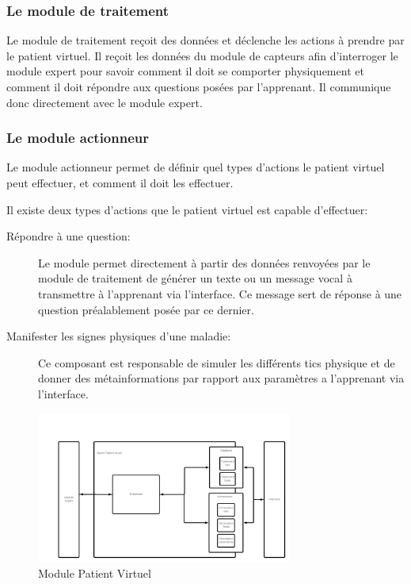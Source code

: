     \subsubsection{Le module de traitement}
    Le module de traitement reçoit des données et déclenche les actions à prendre par le patient virtuel. Il reçoit les données du module de capteurs afin d'interroger le module expert pour savoir comment il doit se comporter physiquement et comment il doit répondre aux questions posées par l'apprenant. Il communique donc directement avec le module expert.
    
    \subsubsection{Le module actionneur}
    Le module actionneur permet de définir quel types d'actions le patient virtuel peut effectuer, et comment il doit les effectuer.
    
    Il existe deux types d'actions que le patient virtuel est capable d'effectuer:
    \begin{description}
        \item[Répondre à une question:] Le module permet directement à partir des données renvoyées par le module de traitement de générer un texte ou un message vocal à transmettre à l'apprenant via l'interface. Ce message sert de réponse à une question préalablement posée par ce dernier.
        \item[Manifester les signes physiques d'une maladie:] Ce composant est responsable de simuler les différents tics physique et de donner des métainformations par rapport aux paramètres a l'apprenant via l'interface.
    \end{description}

    \begin{figure}[H]
        \includegraphics[width=0.75\textwidth]{figures/conc-patient virtuel.png}
        \captionsetup{justification=centering}
        \caption{Module Patient Virtuel}
        \label{fig:5}
    \end{figure}
    
